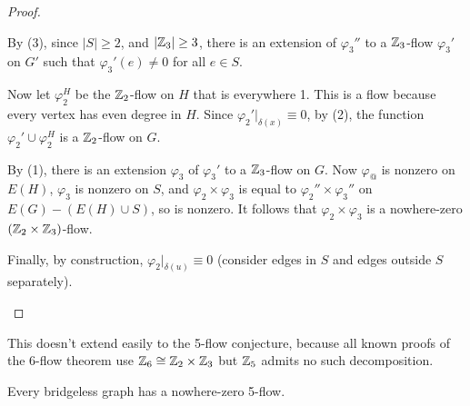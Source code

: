 \documentclass[main.tex]{subfiles}
\begin{document}
\begin{proof}
\begin{itemize}
      By (3), since $|S|\geq 2$, and $|\mathbb Z_3|\geq 3$, there is an extension
      of $\varphi_3''$ to a $\mathbb Z_3$-flow $\varphi_3'$ on $G'$ such that
      $\varphi_3'(e)\neq 0$ for all $e\in S$.

      Now let $\varphi_2^H$ be the $\mathbb Z_2$-flow on $H$ that is everywhere 1.
      This is a flow because every vertex has even degree in $H$.
      Since $\varphi_2'|_{\delta(x)}\equiv 0$, by (2), the function
      $\varphi_2'\cup\varphi_2^H$ is a $\mathbb Z_2$-flow on $G$.

      By (1), there is an extension $\varphi_3$ of $\varphi_3'$ to a
      $\mathbb Z_3$-flow on $G$.
      Now $\varphi_@$ is nonzero on $E(H)$, $\varphi_3$ is nonzero on $S$,
      and $\varphi_2\times\varphi_3$ is equal to $\varphi_2''\times\varphi_3''$
      on $E(G) - (E(H)\cup S)$, so is nonzero.
      It follows that $\varphi_2\times\varphi_3$ is a nowhere-zero
      $(\mathbb Z_2\times\mathbb Z_3)$-flow.

      Finally, by construction, $\varphi_2|_{\delta(u)}\equiv 0$
      (consider edges in $S$ and edges outside $S$ separately). \qedhere
  \end{itemize}
\end{proof}
This doesn't extend easily to the 5-flow conjecture,
because all known proofs of the 6-flow theorem use $\mathbb Z_6\cong\mathbb Z_2\times\mathbb Z_3$
but $\mathbb Z_5$ admits no such decomposition.
\begin{conjecture}
  Every bridgeless graph has a nowhere-zero 5-flow.
\end{conjecture}
\end{document}
